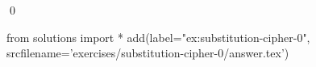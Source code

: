 
\begin{ex} 
  \label{ex:substitution-cipher-0}
  
  \qed
\end{ex} 
\begin{python0}
from solutions import *
add(label="ex:substitution-cipher-0",
    srcfilename='exercises/substitution-cipher-0/answer.tex') 
\end{python0}
